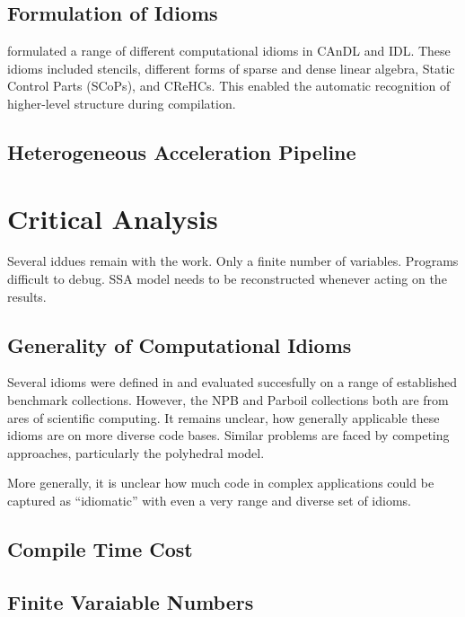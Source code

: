\subsection{Formulation of Idioms}

     formulated a range of
    different computational idioms in CAnDL and IDL.
    These idioms included stencils, different forms of sparse and dense linear
    algebra, Static Control Parts (SCoPs), and CReHCs.
    This enabled the automatic recognition of higher-level structure during
    compilation.

\subsection{Heterogeneous Acceleration Pipeline}


\section{Critical Analysis}

    Several iddues remain with the work.
    Only a finite number of variables.
    Programs difficult to debug.
    SSA model needs to be reconstructed whenever acting on the results.

\subsection{Generality of Computational Idioms}  

    Several idioms were defined in  and
    evaluated succesfully on a range of established benchmark collections.
    However, the NPB and Parboil collections both are from ares of scientific
    computing.
    It remains unclear, how generally applicable these idioms are on more
    diverse code bases.
    Similar problems are faced by competing approaches, particularly the
    polyhedral model.

    More generally, it is unclear how much code in complex applications could
    be captured as ``idiomatic'' with even a very range and diverse set of
    idioms.

\subsection{Compile Time Cost}


\subsection{Finite Varaiable Numbers}

